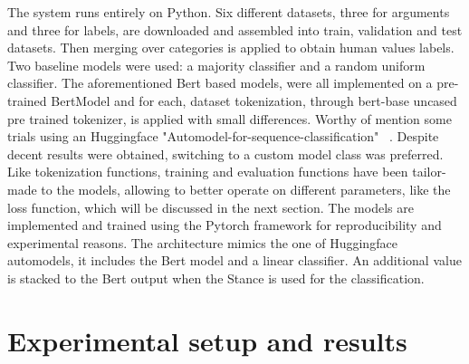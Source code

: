 \documentclass[11pt]{article}
\begin{document}
The system runs entirely on Python. Six different datasets, three for arguments and three for labels, are downloaded and assembled into train, validation and test datasets. Then merging over categories is applied to obtain human values labels.
Two baseline models were used: a majority classifier and a random uniform classifier.
The aforementioned Bert based models, were all implemented on a pre-trained BertModel and for each, dataset tokenization, through bert-base uncased pre trained tokenizer, is applied with small differences.
Worthy of mention some trials using an Huggingface "Automodel-for-sequence-classification" ~\cite{wolf2020huggingfaces}. Despite decent results were obtained, switching to a custom model class was preferred.
Like tokenization functions, training and evaluation functions have been tailor-made to the models, allowing to better operate on different parameters, like the loss function, which will be discussed in the next section.
The models are implemented and trained using the Pytorch framework for reproducibility and
experimental reasons. 
The architecture mimics the one of Huggingface automodels, it includes the Bert model and a linear classifier. An additional value is stacked to the Bert output when the Stance is used for the classification.

\section{Experimental setup and results}
\label{sec:results}
\end{document}

